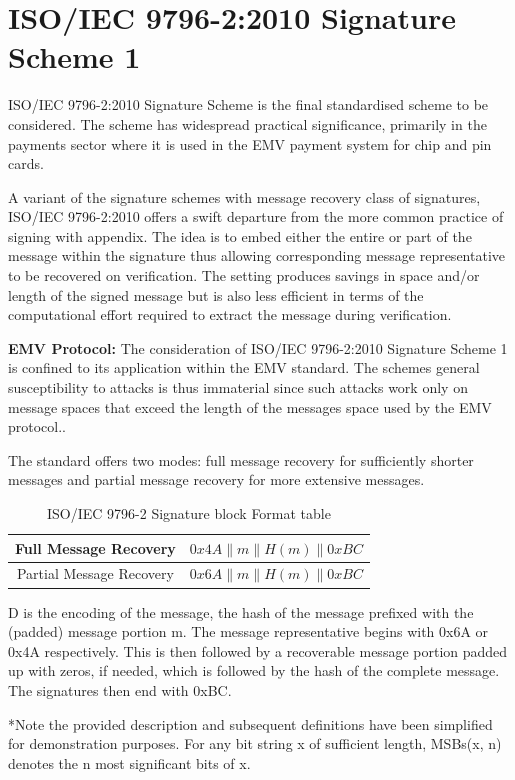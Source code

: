 \documentclass[]{final_report}
\theoremstyle{definition}
\begin{document}
\section{ISO/IEC 9796-2:2010 Signature Scheme 1}
ISO/IEC 9796-2:2010 Signature Scheme is the final standardised scheme to be considered. The scheme has widespread practical significance, primarily in the payments sector where it is used in the EMV payment system for chip and pin cards. 

A variant of the signature schemes with message recovery class of signatures, ISO/IEC 9796-2:2010 offers a swift departure from the more common practice of signing with appendix. The idea is to embed either the entire or part of the message within the signature thus allowing corresponding message representative to be recovered on verification. The setting produces savings in space and/or length of the signed message but is also less efficient in terms of the computational effort required to extract the message during verification.

\textbf{EMV Protocol:} The consideration of ISO/IEC 9796-2:2010 Signature Scheme 1 is confined to its application within the EMV standard. The schemes general susceptibility to attacks is thus immaterial since such attacks work only on message spaces that exceed the length of the messages space used by the EMV protocol..

The standard offers two modes: full message recovery for sufficiently shorter messages and partial message recovery for more extensive messages.


\begin{table}[H]
    \centering
    \caption{ISO/IEC 9796-2 Signature block Format table}
    \begin{tabular}{|c|c|}
    \hline
    Full Message Recovery & $0x4A\|m\|H(m)\|0xBC$ \\
    \hline
    Partial Message Recovery & $0x6A\|m\|H(m)\|0xBC$ \\
    \hline
    \end{tabular}
    \label{tab:sig_block_tab}
\end{table}
D is the encoding of the message, the hash of the message prefixed with the (padded) message portion m. The message representative begins with 0x6A or 0x4A respectively. This is then followed by a recoverable message portion padded up with zeros, if needed, which is followed by the hash of the complete message. The signatures then end with 0xBC. 

*Note the provided description and subsequent definitions have been simplified for demonstration purposes. For any bit string x of sufficient length, MSBs(x, n) denotes the n most significant bits of x.
\end{document}
